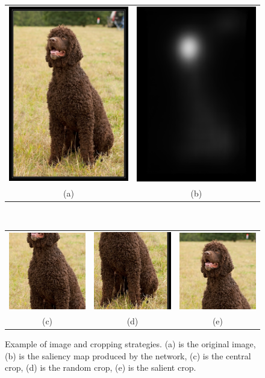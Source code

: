\documentclass[English]{style/ic-tese-v3}
\begin{document}
\begin{figure}
\scriptsize
\begin{center}
    \begin{tabular} {cc}
    \includegraphics[width=0.25\linewidth]{./img/crops/5-raw.JPEG} &
    \includegraphics[width=0.25\linewidth]{./img/crops/5-sals.png} \\
    (a) & (b) \\
    \end{tabular}\\
    \begin{tabular} {ccc}
    \includegraphics[width=0.2\linewidth]{./img/crops/5-central.JPEG} &
    \includegraphics[width=0.2\linewidth]{./img/crops/5-rand.JPEG} &
    \includegraphics[width=0.2\linewidth]{./img/crops/5-soft.JPEG} \\
    (c) & (d) & (e)\\
    \end{tabular}
\caption{\small Example of image and cropping strategies.
    (a) is the original image, (b) is the saliency map produced by the network,
    (c) is the central crop, (d) is the random crop, (e) is the salient crop.}
\label{fig:exp1}
\end{center}
\end{figure}
\end{document}
